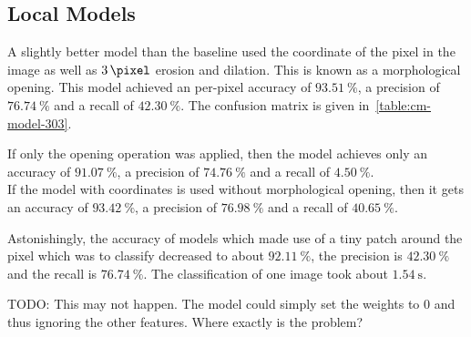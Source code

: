 
\subsection{Local Models}\label{sec:ap4}

A slightly better model than the baseline used the coordinate of the pixel in
the image as well as $\SI{3}{\pixel}$ erosion and dilation. This is known as a
morphological opening. This model achieved an per-pixel accuracy of
$\SI{93.51}{\percent}$, a precision of $\SI{76.74}{\percent}$ and a recall of
$\SI{42.30}{\percent}$. The confusion matrix is given
in~\cref{table:cm-model-303}.

If only the opening operation was applied, then the model achieves only an accuracy
of $\SI{91.07}{\percent}$, a precision of $\SI{74.76}{\percent}$ and a recall
of $\SI{4.50}{\percent}$.\\
If the model with coordinates is used without morphological opening, then it
gets an accuracy of $\SI{93.42}{\percent}$, a precision of $\SI{76.98}{\percent}$
and a recall of $\SI{40.65}{\percent}$.

Astonishingly, the accuracy of models which made use of a tiny patch around the
pixel which was to classify decreased to about $\SI{92.11}{\percent}$, the
precision is $\SI{42.30}{\percent}$ and the recall is $\SI{76.74}{\percent}$.
The classification of one image took about $\SI{1.54}{\second}$.

TODO: This may not happen. The model could simply set the weights to 0 and thus
ignoring the other features. Where exactly is the problem?
